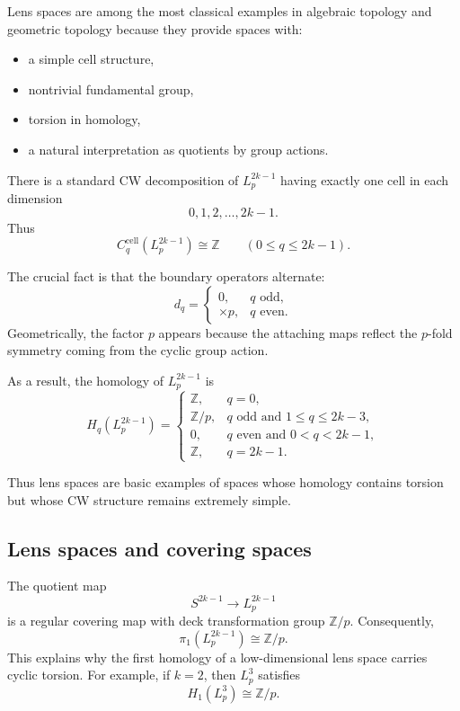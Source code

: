 \documentclass[12pt,a4paper]{article}
\theoremstyle{notespace}
\begin{document}
Lens spaces are among the most classical examples in algebraic topology and geometric topology because they provide spaces with:
\begin{itemize}
	\item a simple cell structure,
	\item nontrivial fundamental group,
	\item torsion in homology,
	\item a natural interpretation as quotients by group actions.
\end{itemize}

There is a standard CW decomposition of \(L_p^{2k-1}\) having exactly one cell in each dimension
\[
0,1,2,\dots,2k-1.
\]
Thus
\[
C_q^{\mathrm{cell}}(L_p^{2k-1})\cong \mathbb Z
\qquad (0\le q\le 2k-1).
\]

The crucial fact is that the boundary operators alternate:
\[
d_q=
\begin{cases}
	0, & q \text{ odd},\\[4pt]
	\times p, & q \text{ even}.
\end{cases}
\]
Geometrically, the factor \(p\) appears because the attaching maps reflect the \(p\)-fold symmetry coming from the cyclic group action.

As a result, the homology of \(L_p^{2k-1}\) is
\[
H_q(L_p^{2k-1})=
\begin{cases}
	\mathbb Z, & q=0,\\[4pt]
	\mathbb Z/p, & q \text{ odd and } 1\le q\le 2k-3,\\[4pt]
	0, & q \text{ even and } 0<q<2k-1,\\[4pt]
	\mathbb Z, & q=2k-1.
\end{cases}
\]

Thus lens spaces are basic examples of spaces whose homology contains torsion but whose CW structure remains extremely simple.

\subsection{Lens spaces and covering spaces}

The quotient map
\[
S^{2k-1}\longrightarrow L_p^{2k-1}
\]
is a regular covering map with deck transformation group \(\mathbb Z/p\). Consequently,
\[
\pi_1(L_p^{2k-1})\cong \mathbb Z/p.
\]
This explains why the first homology of a low-dimensional lens space carries cyclic torsion. For example, if \(k=2\), then \(L_p^3\) satisfies
\[
H_1(L_p^3)\cong \mathbb Z/p.
\]
\end{document}
